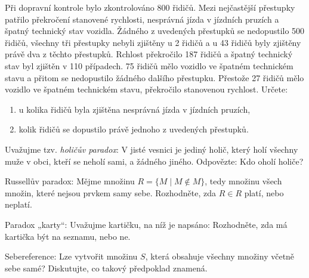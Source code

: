 \documentclass[12pt,a4paper]{article}
\begin{document}
\begin{exercise}
Při dopravní kontrole bylo zkontrolováno 800 řidičů. 
Mezi nejčastější přestupky patřilo překročení stanovené rychlosti, 
nesprávná jízda v jízdních pruzích a špatný technický stav vozidla. 
Žádného z uvedených přestupků se nedopustilo 500 řidičů, 
všechny tři přestupky nebyli zjištěny u 2 řidičů a 
u 43 řidičů byly zjištěny právě dva z těchto přestupků. 
Rchlost překročilo 187 řidičů a špatný technický stav byl zjištěn v 110 případech. 
75 řidičů mělo vozidlo ve špatném technickém stavu 
a přitom se nedopustilo žádného dalšího přestupku. 
Přestože 27 řidičů mělo vozidlo ve špatném technickém stavu, 
překročilo stanovenou rychlost.
Určete:  
\begin{enumerate}[label=\alph*)]
    \item u kolika řidičů byla zjištěna nesprávná jízda v jízdních pruzích,
    \item kolik řidičů se dopustilo právě jednoho z uvedených přestupků.
\end{enumerate}
\end{exercise}


\setcounter{section}{0}
\begin{exercise}[BONUS]
Uvažujme tzv. \emph{holičův paradox}:  
V jisté vesnici je jediný holič, který holí všechny muže v obci, kteří se neholí sami, a žádného jiného.  
Odpovězte: Kdo oholí holiče?  
\end{exercise}


\begin{exercise}[BONUS]
Russellův paradox:  
Mějme množinu $R = \{ M \mid M \notin M \}$, tedy množinu všech množin, které nejsou prvkem samy sebe.  
Rozhodněte, zda $R \in R$ platí, nebo neplatí.  
\end{exercise}


\begin{exercise}[BONUS]
Paradox „karty“:  
Uvažujme kartičku, na níž je napsáno:  
Rozhodněte, zda má kartička být na seznamu, nebo ne.  
\end{exercise}


\begin{exercise}[BONUS]
Sebereference:  
Lze vytvořit množinu $S$, která obsahuje všechny množiny včetně sebe samé?  
Diskutujte, co takový předpoklad znamená.  
\end{exercise}
\end{document}
